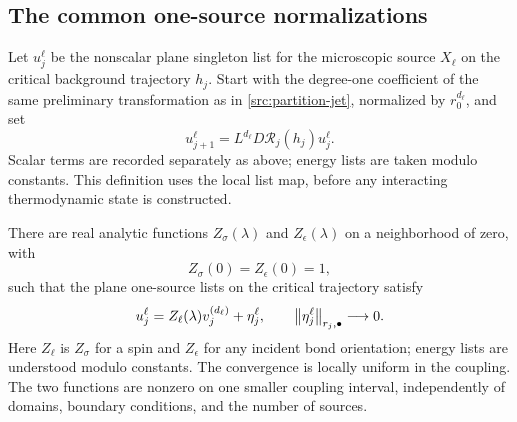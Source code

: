 \subsection{The common one-source normalizations}

Let $u_j^\ell$ be the nonscalar plane singleton list for the microscopic
source $X_\ell$ on the critical background trajectory $h_j$. Start with
the degree-one coefficient of the same preliminary transformation as
in \eqref{src:partition-jet}, normalized by $r_0^{d_\ell}$, and set
\[
 u_{j+1}^\ell=L^{d_\ell}D\mathcal R_j(h_j)u_j^\ell.
\]
Scalar terms are recorded separately as above; energy lists are taken
modulo constants. This definition uses the local list map, before any
interacting thermodynamic state is constructed.

\begin{proposition}
\label{src:scalar}
There are real analytic functions $Z_\sigma(\lambda)$ and
$Z_\epsilon(\lambda)$ on a neighborhood of zero, with
\[
 Z_\sigma(0)=Z_\epsilon(0)=1,
\]
such that the plane one-source lists on the critical trajectory satisfy
\begin{equation}
 u_j^\ell
   =Z_\ell(\lambda)v_j^{(d_\ell)}+\eta_j^\ell,
 \qquad
 \left\|\eta_j^\ell\right\|_{r_j,\bullet}\longrightarrow0.
 \label{src:one-source}
\end{equation}
Here $Z_\ell$ is $Z_\sigma$ for a spin and $Z_\epsilon$ for any incident
bond orientation; energy lists are understood modulo constants.
The convergence is locally uniform in the coupling. The two functions
are nonzero on one smaller coupling interval, independently of domains,
boundary conditions, and the number of sources.
\end{proposition}

